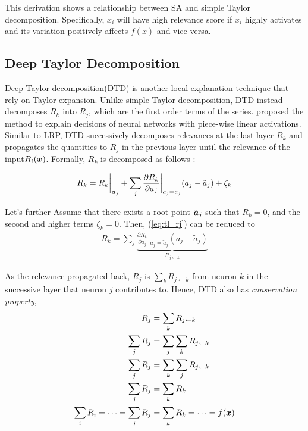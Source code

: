 This derivation shows a relationship between SA and simple Taylor decomposition. Specifically, $x_i$ will have high relevance score if $x_i$ highly activates and its variation positively affects $f(x)$ and vice versa.


\subsection{Deep Taylor Decomposition}
Deep Taylor decomposition(DTD) is another local explanation technique that rely on Taylor expansion. Unlike simple Taylor decomposition, DTD instead decomposes $R_k$ into $R_j$, which are the first order terms of the series. \cite{MontavonExplainingnonlinearclassification2017} proposed the method to explain decisions of neural networks with piece-wise linear activations. Similar to LRP, DTD successively decomposes relevances at the last layer $R_k$ and propagates the quantities to $R_j$ in the previous layer until the relevance of the input$R_i(\boldsymbol{x})$. Formally, $R_k$ is decomposed as follows :




 \begin{align} \label{eq:tl_rj}
 R_k = R_k \bigg|_{ \tilde{\patvector{a}}_j } + \sum_{ j } 	\frac{\partial  R_k }{ \partial a_j } \bigg|_{ a_j = \tilde{a}_j } ( a_j - \tilde{a}_j ) + \zeta_k
 \end{align}

Let's further Assume that there exists a root point $\tilde{\patvector{a}}_j$ such that $R_k = 0$, and the second and higher terms $\zeta_k = 0 $. Then, (\ref{eq:tl_rj}) can be reduced to
\begin{align} \label{eq:R_k_sum}
 R_k = \sum_{ j } \underbrace{	\frac{\partial  R_k }{ \partial a_j } \bigg|_{ a_j = \tilde{a}_j }  ( a_j - \tilde{a}_j ) }_{ R_{j \leftarrow k } }
\end{align}

As the relevance propagated back,  $R_j$ is $\sum_{k} R_{j\leftarrow k}$ from neuron $k$ in the successive layer that neuron $j$ contributes to. Hence, DTD also has \textit{conservation property}, 
\begin{align} 
	R_j &= \sum_{k} R_{j\leftarrow k} \label{eq:rj_from_rk} \\
\sum_{j}	R_j &= \sum_{j} \sum_{k} R_{j\leftarrow k}\\
\sum_{j}	R_j &= \sum_{k} \sum_{j} R_{j\leftarrow k} \\
\sum_{j}	R_j &= \sum_{k}  R_{k} \\
\sum_i 	R_{i} = 	\dots = \sum_j R_{j} &= \sum_k R_{k} = \dots =  f(\patvector{x}) \label{eq:rj_equal_rk}
\end{align}

